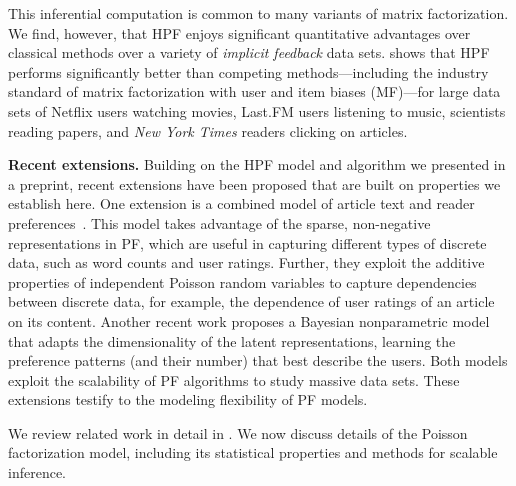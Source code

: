 

This inferential computation is common to many variants of matrix
factorization.  We find, however, that HPF enjoys significant
quantitative advantages over classical methods over a variety of
\emph{implicit feedback} data sets.  shows
that HPF performs significantly better than competing
methods---including the industry standard of matrix factorization with
user and item biases (MF)---for large data sets of Netflix users
watching movies, Last.FM users listening to music, scientists reading
papers, and \textit{New York Times} readers clicking on articles.


{\bf Recent extensions.}  
Building on the HPF model and algorithm we presented in a preprint,
recent extensions have been proposed that are built on properties we
establish here. One extension is a combined model of article text and
reader preferences~\cite{gopalan2014content}. This model takes
advantage of the sparse, non-negative representations in PF, which are
useful in capturing different types of discrete data, such as word
counts and user ratings. Further, they exploit the additive properties
of independent Poisson random variables to capture dependencies
between discrete data, for example, the dependence of user ratings of
an article on its content. Another recent work proposes a Bayesian
nonparametric model~\cite{gopalan2014bayesian} that adapts the
dimensionality of the latent representations, learning the preference
patterns (and their number) that best describe the users. Both models
exploit the scalability of PF algorithms to study massive data sets.
These extensions testify to the modeling flexibility of PF models.

We review related work in detail in . We now discuss
details of the Poisson factorization model, including its statistical
properties and methods for scalable inference.




